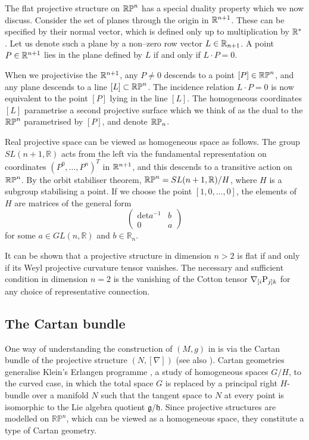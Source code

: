 The flat projective structure on $\mathbb{RP}^n$ has a special duality property which we now discuss. Consider the set of planes through the origin in $\mathbb{R}^{n+1}$. These can be specified by their normal vector, which is defined only up to multiplication by $\mathbb{R}^*$. Let us denote such a plane by a non--zero row vector $L\in\mathbb{R}_{n+1}$. A point $P\in\mathbb{R}^{n+1}$ lies in the plane defined by $L$ if and only if $L\cdot P=0$.

When we projectivise the $\mathbb{R}^{n+1}$, any $P\neq 0$ descends to a point $[P]\in\mathbb{RP}^n$, and any plane descends to a line $[L]\subset\mathbb{RP}^n$. The incidence relation $L\cdot P=0$ is now equivalent to the point $[P]$ lying in the line $[L]$. The homogeneous coordinates $[L]$ parametrise a second projective surface which we think of as the dual to the $\mathbb{RP}^n$ parametrised by $[P]$, and denote $\mathbb{RP}_n$.

Real projective space can be viewed as homogeneous space as follows. 
The group $SL(n+1,\mathbb{R})$ acts from the left via the fundamental representation on coordinates $(P^0,\dots,P^n)^T$ in $\mathbb{R}^{n+1}$, and this descends to a transitive action on $\mathbb{RP}^n$. By the orbit stabiliser theorem, $\mathbb{RP}^n=SL(n+1,\mathbb{R})/H$, where $H$ is a subgroup stabilising a point. If we choose the point $[1,0,\dots,0]$, the elements of $H$ are matrices of the general form
\[
\begin{pmatrix}\mathrm{det}a^{-1} & b\\
0 & a
\end{pmatrix}
\]
for some $a\in GL(n,\mathbb{R})$ and $b\in\mathbb{R}_{n}$. 

It can be shown that a projective structure in dimension $n>2$ is flat if and only if its Weyl projective curvature tensor vanishes. The necessary and sufficient condition in dimension $n=2$ is the vanishing of the Cotton tensor $\nabla_{[i}\mathrm{P}_{j]k}$ for any choice of representative connection.

\subsection{The Cartan bundle}

One way of understanding the construction of $(M,g)$ in \cite{DM}
is via the Cartan bundle \cite{Cartan} of the projective structure $(N,[\nabla])$ (see also \cite{KobNag}). Cartan geometries generalise Klein's Erlangen programme \cite{Klein}, a study of homogeneous spaces $G/H$, to the curved case, in which the total space $G$ is replaced by a principal right $H$-bundle over a manifold $N$ such that the tangent space to $N$ at every point is isomorphic to the Lie algebra quotient $\mathfrak{g}/\mathfrak{h}$. Since projective structures are modelled on $\mathbb{RP}^{n}$, which can be viewed as a homogeneous space, they constitute a type of Cartan geometry.

